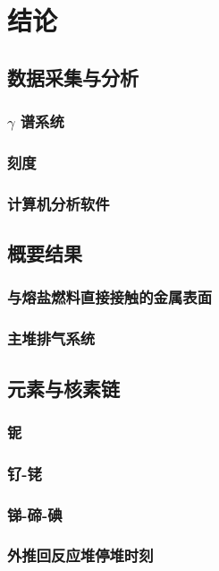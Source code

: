 \chapter{结论}


\section{数据采集与分析}

\subsection{$\gamma$ 谱系统}

\subsection{刻度}

\subsection{计算机分析软件}

\section{概要结果}

\subsection{与熔盐燃料直接接触的金属表面}

\subsection{主堆排气系统}

\section{元素与核素链}
\subsection{铌}
\subsection{钌-铑}
\subsection{锑-碲-碘}
\subsection{外推回反应堆停堆时刻}
